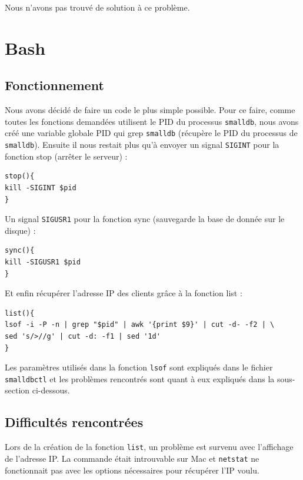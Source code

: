 \documentclass[utf8]{article}
\begin{document}
Nous n'avons pas trouvé de solution à ce problème.


\section{Bash}

\subsection{Fonctionnement}

Nous avons décidé de faire un code le plus simple possible. Pour ce faire, comme toutes les fonctions demandées utilisent le PID du processus \texttt{smalldb}, nous avons créé une variable globale PID qui grep \texttt{smalldb} (récupère le PID du processus de \texttt{smalldb}). Ensuite il nous restait plus qu'à envoyer un signal \texttt{SIGINT} pour la fonction stop (arrêter le serveur) :

\begin{lstlisting}
stop(){
kill -SIGINT $pid
}
\end{lstlisting}

Un signal \texttt{SIGUSR1} pour la fonction sync (sauvegarde la base de donnée sur le disque) :

\begin{lstlisting}
sync(){
kill -SIGUSR1 $pid
}
\end{lstlisting}

Et enfin récupérer l'adresse IP des clients grâce à la fonction list : 

\begin{lstlisting}
list(){
lsof -i -P -n | grep "$pid" | awk '{print $9}' | cut -d- -f2 | \
sed 's/>//g' | cut -d: -f1 | sed '1d'
}
\end{lstlisting}

Les paramètres utilisés dans la fonction \texttt{lsof} sont expliqués dans le fichier \texttt{smalldbctl} et les problèmes rencontrés sont quant à eux expliqués dans la sous-section ci-dessous.

\subsection{Difficultés rencontrées}

Lors de la création de la fonction \texttt{list}, un problème est survenu avec l'affichage de l'adresse IP. La commande  était introuvable sur Mac et \texttt{netstat} ne fonctionnait pas avec les options nécessaires pour récupérer l'IP voulu.
\end{document}
